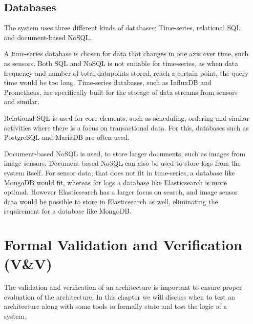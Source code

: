 \subsection{Databases}

The system uses three different kinds of databases; Time-series, relational SQL and document-based NoSQL.

A time-series database is chosen for data that changes in one axis over time, such as sensors. Both SQL and NoSQL is not suitable for time-series, as when data frequency and number of total datapoints stored, reach a certain point, the query time would be too long. Time-series databases, such as InfluxDB and Prometheus, are specifically built for the storage of data streams from sensors and similar.

Relational SQL is used for core elements, such as scheduling, ordering and similar activities where there is a focus on transactional data. For this, databases such as PostgreSQL and MariaDB are often used.

Document-based NoSQL is used, to store larger documents, such as images from image sensors. Document-based NoSQL can also be used to store logs from the system itself. For sensor data, that does not fit in time-series, a database like MongoDB would fit, whereas for logs a database like Elasticsearch is more optimal. However Elasticsearch has a larger focus on search, and image sensor data would be possible to store in Elasticsearch as well, eliminating the requirement for a database like MongoDB. 


\section{Formal Validation and Verification (V\&V)}
\label{sec:formal-v-v}
The validation and verification of an architecture is important to ensure proper evaluation of the architecture. In this chapter we will discuss when to test an architecture along with some tools to formally state and test the logic of a system.



